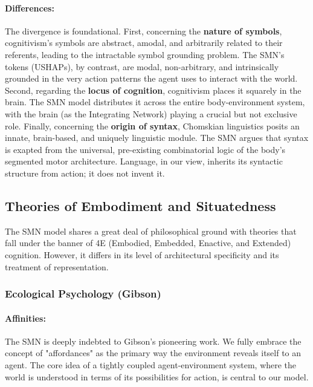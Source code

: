 \paragraph{Differences:} The divergence is foundational. First, concerning the \textbf{nature of symbols}, cognitivism's symbols are abstract, amodal, and arbitrarily related to their referents, leading to the intractable symbol grounding problem. The SMN's tokens (USHAPs), by contrast, are modal, non-arbitrary, and intrinsically grounded in the very action patterns the agent uses to interact with the world. Second, regarding the \textbf{locus of cognition}, cognitivism places it squarely in the brain. The SMN model distributes it across the entire body-environment system, with the brain (as the Integrating Network) playing a crucial but not exclusive role. Finally, concerning the \textbf{origin of syntax}, Chomskian linguistics posits an innate, brain-based, and uniquely linguistic module. The SMN argues that syntax is exapted from the universal, pre-existing combinatorial logic of the body's segmented motor architecture. Language, in our view, inherits its syntactic structure from action; it does not invent it.
\subsection{Theories of Embodiment and Situatedness}\label{subsec:comparison_embodiment}
The SMN model shares a great deal of philosophical ground with theories that fall under the banner of 4E (Embodied, Embedded, Enactive, and Extended) cognition. However, it differs in its level of architectural specificity and its treatment of representation.  \subsubsection{Ecological Psychology (Gibson)}\label{ssubsec:ecological}\paragraph{Affinities:} The SMN is deeply indebted to Gibson's pioneering work. We fully embrace the concept of "affordances" as the primary way the environment reveals itself to an agent. The core idea of a tightly coupled agent-environment system, where the world is understood in terms of its possibilities for action, is central to our model.
